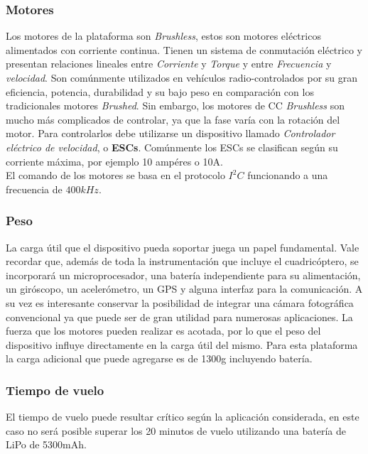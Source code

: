 \documentclass[main]{subfiles}
\begin{document}
\subsubsection*{Motores}
Los motores de la plataforma son \emph{Brushless}, estos son motores el\'ectricos alimentados con corriente continua. Tienen un sistema de conmutaci\'on el\'ectrico y presentan relaciones lineales entre \emph{Corriente} y \emph{Torque} y entre \emph{Frecuencia} y \emph{velocidad}. Son com\'unmente utilizados en veh\'iculos radio-controlados por su gran eficiencia, potencia, durabilidad y su bajo peso en comparaci\'on con los tradicionales motores \emph{Brushed}. Sin embargo, los motores de CC \emph{Brushless} son mucho m\'as complicados de controlar, ya que la fase var\'ia con la rotaci\'on del motor. Para controlarlos debe utilizarse un dispositivo llamado \emph{Controlador el\'ectrico de velocidad}, o \textbf{ESCs}. Com\'unmente los ESCs se clasifican seg\'un su corriente m\'axima, por ejemplo 10 amp\'eres o 10A.\\

El comando de los motores se basa en el protocolo $I^2C$ funcionando a una frecuencia de $400kHz$.  

\subsubsection*{Peso}

	La carga \'util que el dispositivo pueda soportar juega un papel fundamental. Vale recordar que, adem\'as de toda la instrumentaci\'on que incluye el cuadric\'optero, se incorporar\'a un microprocesador, una bater\'ia independiente para su alimentaci\'on, un gir\'oscopo, un aceler\'ometro, un GPS y alguna interfaz para la comunicaci\'on. A su vez es interesante conservar la posibilidad de integrar una c\'amara fotogr\'afica convencional ya que puede ser de gran utilidad para numerosas aplicaciones. La fuerza que los motores pueden realizar es acotada, por lo que el peso del dispositivo influye directamente en la carga \'util del mismo. Para esta plataforma la carga adicional que puede agregarse es de 1300g incluyendo bater\'ia. 

\subsubsection*{Tiempo de vuelo}

El tiempo de vuelo puede resultar cr\'itico seg\'un la aplicaci\'on considerada, en este caso no ser\'a posible superar los 20 minutos de vuelo utilizando una bater\'ia de LiPo de 5300mAh. 
\end{document}
